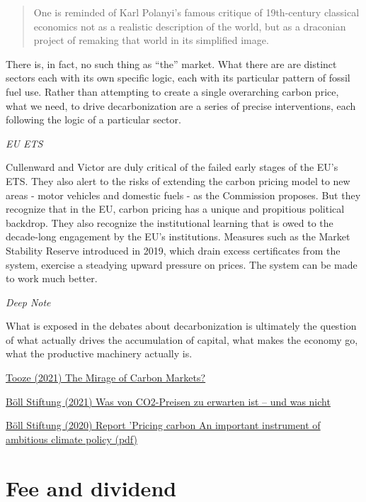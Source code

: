 \documentclass[
]{book}
\begin{document}
\begin{quote}
One is reminded of Karl Polanyi's famous critique of 19th-century classical economics not as a realistic description of the world, but as a draconian project of remaking that world in its simplified image.
\end{quote}

There is, in fact, no such thing as ``the'' market. What there are are distinct sectors each with its own specific logic, each with its particular pattern of fossil fuel use. Rather than attempting to create a single overarching carbon price, what we need, to drive decarbonization are a series of precise interventions, each following the logic of a particular sector.

\emph{EU ETS}

Cullenward and Victor are duly critical of the failed early stages of the EU's ETS. They also alert to the risks of extending the carbon pricing model to new areas - motor vehicles and domestic fuels - as the Commission proposes. But they recognize that in the EU, carbon pricing has a unique and propitious political backdrop. They also recognize the institutional learning that is owed to the decade-long engagement by the EU's institutions. Measures such as the Market Stability Reserve introduced in 2019, which drain excess certificates from the system, exercise a steadying upward pressure on prices. The system can be made to work much better.

\emph{Deep Note}

What is exposed in the debates about decarbonization is ultimately the question of what actually drives the accumulation of capital, what makes the economy go, what the productive machinery actually is.

\href{https://adamtooze.substack.com/p/adam-tooze-chartbook-31-the-mirage}{Tooze (2021) The Mirage of Carbon Markets?}

\href{https://www.boell.de/de/2021/02/03/was-von-co2-preisen-zu-erwarten-ist-und-was-nicht}{Böll Stiftung (2021) Was von CO2-Preisen zu erwarten ist -- und was nicht}

\href{pdf/Boell_Pricing_Carbon.pdf}{Böll Stiftung (2020) Report 'Pricing carbon An important instrument of ambitious climate policy (pdf)}

\hypertarget{fee-and-dividend}{%
\chapter{Fee and dividend}\label{fee-and-dividend}}
\end{document}
